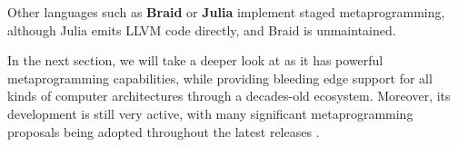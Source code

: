 \documentclass[../main]{subfiles}
\begin{document}
Other languages such as \textbf{Braid} \cite{braid} or
\textbf{Julia} \cite{julia} implement staged metaprogramming,
although Julia emits LLVM code directly, and Braid is unmaintained.

In the next section, we will take a deeper look at \cpp as it has
powerful metaprogramming capabilities, while providing bleeding edge support for
all kinds of computer architectures through a decades-old
ecosystem. Moreover, its development is still very active, with many significant
metaprogramming proposals being adopted throughout the latest releases
\cite{10.1145/3564719.3568692}.
\end{document}

